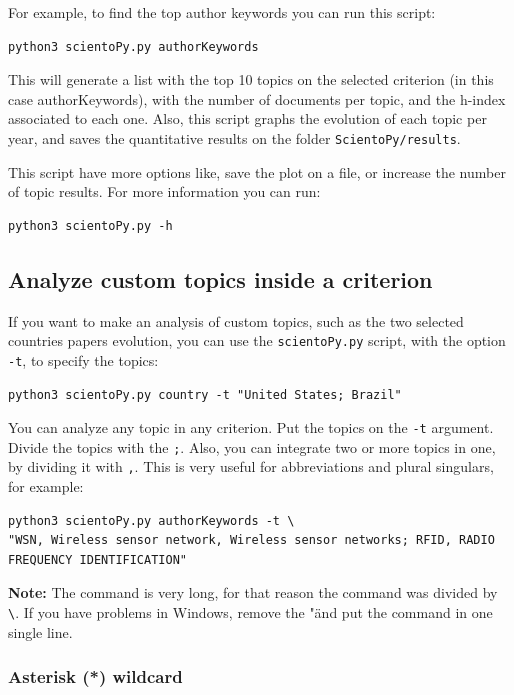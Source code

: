 \documentclass[10pt,letterpaper]{article}
\begin{document}
For example, to find the top author keywords you can run this script: 

\begin{verbatim}
python3 scientoPy.py authorKeywords
\end{verbatim}

This will generate a list with the top 10 topics on the selected criterion (in this case authorKeywords), with the number of documents per topic, and the h-index associated to each one. Also, this script graphs the evolution of each topic per year, and saves the quantitative results on the folder \verb|ScientoPy/results|. 

This script have more options like, save the plot on a file, or increase the number of topic results. For more information you can run:

\begin{verbatim}
python3 scientoPy.py -h
\end{verbatim}

\subsection{Analyze custom topics inside a criterion}

If you want to make an analysis of custom topics, such as the two selected countries papers evolution, you can use the \verb|scientoPy.py| script, with the option \verb|-t|, to specify the topics: 

\begin{verbatim}
python3 scientoPy.py country -t "United States; Brazil"
\end{verbatim}

You can analyze any topic in any criterion. Put the topics on the \verb|-t| argument. Divide the topics with the \verb|;|. Also, you can integrate two or more topics in one, by dividing it with \verb|,|. This is very useful for abbreviations and plural singulars, for example: 
\begin{verbatim}
python3 scientoPy.py authorKeywords -t \
"WSN, Wireless sensor network, Wireless sensor networks; RFID, RADIO FREQUENCY IDENTIFICATION"
\end{verbatim}

\textbf{Note: } The command is very long, for that reason the command was divided by \verb|\|. If you have problems in Windows, remove the "\" and put the command in one single line.

\subsubsection{Asterisk (*) wildcard}
\end{document}
